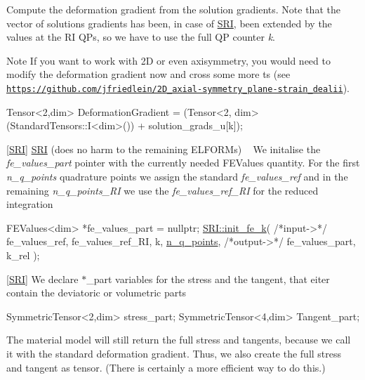  Compute the deformation gradient from the solution gradients. Note that the vector of solutions gradients has been, in case of \hyperlink{namespaceSRI}{S\+RI}, been extended by the values at the RI Q\+Ps, so we have to use the full QP counter {\itshape k}. \begin{DoxyNote}{Note}
If you want to work with 2D or even axisymmetry, you would need to modify the deformation gradient now and cross some more t\textquotesingle{}s (see \href{https://github.com/jfriedlein/2D_axial-symmetry_plane-strain_dealii}{\tt https\+://github.\+com/jfriedlein/2\+D\+\_\+axial-\/symmetry\+\_\+plane-\/strain\+\_\+dealii}).
\end{DoxyNote}

\begin{DoxyCode}
Tensor<2,dim> DeformationGradient = (Tensor<2, dim>(StandardTensors::I<dim>()) + solution\_grads\_u[k]);
\end{DoxyCode}
 \mbox{[}\hyperlink{namespaceSRI}{S\+RI}\mbox{]} \hyperlink{namespaceSRI}{S\+RI} (does no harm to the remaining E\+L\+F\+O\+R\+Ms) ~\newline
We initalise the {\itshape fe\+\_\+values\+\_\+part} pointer with the currently needed F\+E\+Values quantity. For the first {\itshape n\+\_\+q\+\_\+points} quadrature points we assign the standard {\itshape fe\+\_\+values\+\_\+ref} and in the remaining {\itshape n\+\_\+q\+\_\+points\+\_\+\+RI} we use the {\itshape fe\+\_\+values\+\_\+ref\+\_\+\+RI} for the reduced integration 
\begin{DoxyCode}
FEValues<dim> *fe\_values\_part = \textcolor{keyword}{nullptr};
\hyperlink{namespaceSRI_a304be230ce6414b79b92c2921ad38524}{SRI::init\_fe\_k}( \textcolor{comment}{/*input->*/} fe\_values\_ref, fe\_values\_ref\_RI, k, 
      \hyperlink{assembly__routine__SRI_8cc_afd52b693751274175b93a58458201e6b}{n\_q\_points},
                \textcolor{comment}{/*output->*/} fe\_values\_part, k\_rel );
\end{DoxyCode}
 \mbox{[}\hyperlink{namespaceSRI}{S\+RI}\mbox{]} We declare $\ast$\+\_\+part variables for the stress and the tangent, that eiter contain the deviatoric or volumetric parts 
\begin{DoxyCode}
SymmetricTensor<2,dim> stress\_part;
SymmetricTensor<4,dim> Tangent\_part;
\end{DoxyCode}
 The material model will still return the full stress and tangents, because we call it with the standard deformation gradient. Thus, we also create the full stress and tangent as tensor. (There is certainly a more efficient way to do this.) 
